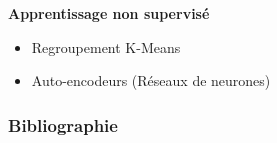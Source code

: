 \documentclass[]{beamer} %
\begin{document}

\begin{frame}

\begin{center}
	\Huge\bfseries Apprentissage non supervisé
\end{center}

\begin{itemize}
	\item Regroupement K-Means
	\item Auto-encodeurs (Réseaux de neurones)
\end{itemize}

\end{frame}



\begin{frame}
\begin{center}
	\frametitle{Bibliographie}
	\scriptsize
	
	
\end{center}
\end{frame}
\end{document}
